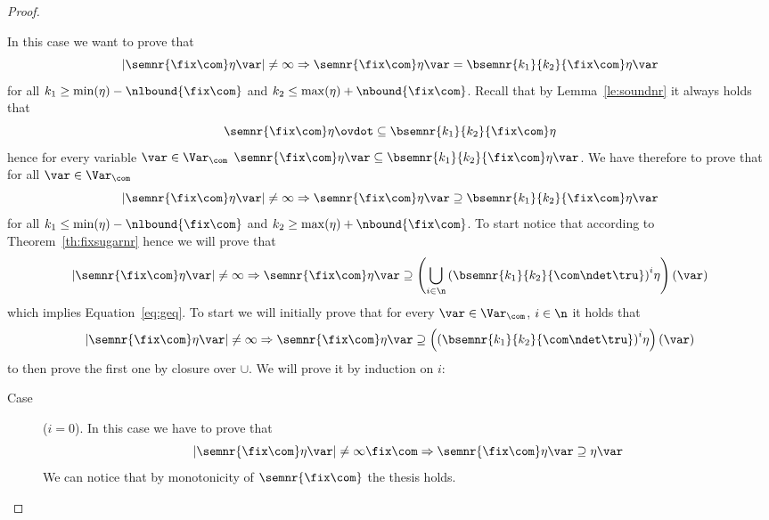 \begin{proof}
\begin{inductive}
    \case{\(\fix\com\)} In this case we want to prove that
    \begin{equation*}
      |\semnr{\fix\com}\eta\var| \neq \infty \Rightarrow \semnr{\fix\com}\eta\var = \bsemnr{k_1}{k_2}{\fix\com}\eta\var
    \end{equation*}
    for all \(k_1 \geq \min(\eta) - \nlbound{\fix\com}\) and
    \(k_2 \leq \max(\eta) + \nbound{\fix\com}\). Recall that by
    Lemma~\ref{le:soundnr} it always holds that
    \begin{equation*}
      \semnr{\fix\com}\eta \ovdot\subseteq \bsemnr{k_1}{k_2}{\fix\com}\eta
    \end{equation*}
    hence for every variable \(\var \in \Var_{\com}\)
    \(\semnr{\fix\com}\eta\var \subseteq
    \bsemnr{k_1}{k_2}{\fix\com}\eta\var\). We have therefore to prove
    that for all \(\var\in \Var_{\com}\)
    \begin{equation}\label{eq:geq}
      |\semnr{\fix\com}\eta\var| \neq \infty \Rightarrow \semnr{\fix\com}\eta\var \supseteq \bsemnr{k_1}{k_2}{\fix\com}\eta\var
    \end{equation}
    for all \(k_1 \leq \min(\eta) - \nlbound{\fix\com}\) and
    \(k_2 \geq \max(\eta) + \nbound{\fix\com}\). To start notice that
    according to Theorem~\ref{th:fixsugarnr} hence we will prove that
    \begin{equation*}
      |\semnr{\fix\com}\eta\var| \neq \infty \Rightarrow \semnr{\fix\com}\eta\var \supseteq \left(\bigcup_{i\in\n} {\left(\bsemnr{k_1}{k_2}{\com \ndet \tru}\right)}^i\eta\right)(\var)
    \end{equation*}
    which implies Equation~\ref{eq:geq}. To start we will initially
    prove that for every \(\var\in\Var_{\com}\), \(i\in\n\) it holds
    that
    \begin{equation*}
      |\semnr{\fix\com}\eta\var| \neq \infty \Rightarrow
      \semnr{\fix\com}\eta\var \supseteq
      \left({\left(\bsemnr{k_1}{k_2}{\com \ndet \tru}\right)}^i\eta\right)(\var)
    \end{equation*}
    to then prove the first one by closure over \(\cup\). We will
    prove it by induction on \(i\):
    \begin{description}
      
    \item[Case] (\(i=0\)). In this case we have to prove that
      \[|\semnr{\fix\com}\eta\var| \neq \infty\fix\com \Rightarrow
        \semnr{\fix\com}\eta\var \supseteq \eta\var\] We can notice
      that by monotonicity of \(\semnr{\fix\com}\) the thesis holds.
      

\end{description}
\end{inductive}
\end{proof}
